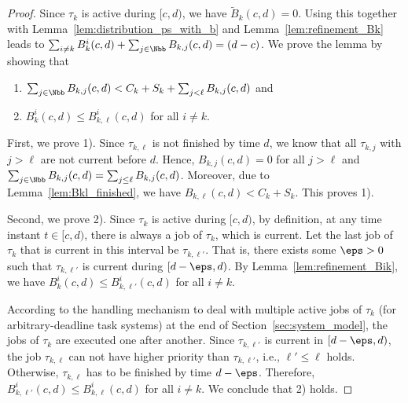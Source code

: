 \documentclass[conference]{IEEEtran}
\theoremstyle{definition}
\theoremstyle{remark}
\newcommand{\Btilde}{\widetilde{B}}
\begin{document}
	\begin{proof}
		Since $\tau_k$ is active during $[c,d)$, we have $\Btilde_k(c,d) = 0$.
		Using this together with Lemma~\ref{lem:distribution_ps_with_b} and Lemma~\ref{lem:refinement_Bk} leads to $\sum_{i\neq k} B^i_k(c,d) + \sum_{j\in\Nbb} B_{k,j}(c,d) = (d-c)$.
		We prove the lemma by showing that 
		\begin{enumerate}
			\item $\sum_{j \in \Nbb} B_{k,j}(c,d) < C_k+S_k + \sum_{j < \ell} B_{k,j}(c,d)$ and
			\item $B^i_k(c,d)\leq B^i_{k,\ell}(c,d)$ for all $i\neq k$.
		\end{enumerate}
		
		First, we prove 1). 
		Since $\tau_{k,\ell}$ is not finished by time $d$, we know that all $\tau_{k,j}$ with $j>\ell$ are not current before $d$.
		Hence, $B_{k,j}(c,d) = 0$ for all $j > \ell$ and $\sum_{j \in \Nbb} B_{k,j}(c,d) = \sum_{j \leq \ell} B_{k,j}(c,d)$.
		Moreover, due to Lemma~\ref{lem:Bkl_finished}, we have $B_{k,\ell}(c,d) < C_k+S_k$.
		This proves 1).
		
		Second, we prove 2).
		Since $\tau_{k}$ is active during $[c,d)$, by definition, at any time instant $t \in [c, d)$, there is always a job of $\tau_k$, which is current. Let the last job of $\tau_k$ that is current in this interval be $\tau_{k,\ell'}$. That is, there exists some $\eps >0$ such that $\tau_{k,\ell'}$ is current during $[d-\eps,d)$.  By Lemma~\ref{lem:refinement_Bik}, we have $B^i_k(c,d) \leq B^i_{k,\ell'}(c,d)$ for all $i\neq k$.

        According to the handling mechanism to deal with multiple
        active jobs of $\tau_k$ (for arbitrary-deadline task systems) at the end of Section~\ref{sec:system_model}, the jobs of
        $\tau_k$ are executed one after another. Since
        $\tau_{k,\ell'}$ is current in $[d-\eps,d)$, the job
        $\tau_{k,\ell}$ can not have higher priority than
        $\tau_{k, \ell'}$, i.e., $\ell' \leq \ell$ holds.
        Otherwise,
        $\tau_{k,\ell}$ has to be finished by time $d-\eps$.
        Therefore, $B^i_{k,\ell'}(c,d) \leq B^i_{k,\ell}(c,d)$ for all
        $i\neq k$. 
        We conclude that 2) holds.
	\end{proof}
	
\end{document}
